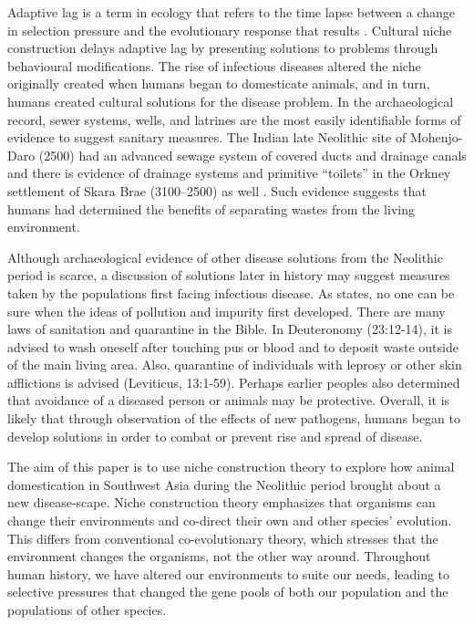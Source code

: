 Adaptive lag is a term in ecology that refers to the time lapse between a change in selection pressure and the evolutionary response that results \parencite[98]{Laland_2006}. 
Cultural niche construction delays adaptive lag by presenting solutions to problems through behavioural modifications. 
The rise of infectious diseases altered the niche originally created when humans began to domesticate animals, and in turn, humans created cultural solutions for the disease problem. 
In the archaeological record, sewer systems, wells, and latrines are the most easily identifiable forms of evidence to suggest sanitary measures.
The Indian late Neolithic site of Mohenjo-Daro (2500\BC) had an advanced sewage system of covered ducts and drainage canals \parencite[121]{Mughal_2011} 
and there is evidence of drainage systems and primitive “toilets” 
in the Orkney settlement of Skara Brae (3100--2500\BC) as well \parencite{Gordon-Childe_1983}. 
Such evidence suggests that humans had determined the benefits of separating wastes from the living environment.

Although archaeological evidence of other disease solutions from the Neolithic period is scarce, 
a discussion of solutions later in history may suggest measures taken by the populations 
first facing infectious disease. As \textcite[3]{Douglas_1966} states, 
no one can be sure when the ideas of pollution and impurity first developed. 
There are many laws of sanitation and quarantine in the Bible. In Deuteronomy (23:12-14), 
it is advised to wash oneself after touching pus or blood and to deposit waste outside of the main living area.
Also, quarantine of individuals with leprosy or other skin afflictions is advised (Leviticus, 13:1-59).
Perhaps earlier peoples also determined that avoidance of a diseased person or animals may be protective. Overall, it is likely that through observation of the effects of new pathogens, humans began to develop solutions in order to combat or prevent rise and spread of disease.

The aim of this paper is to use niche construction theory to explore how animal domestication in Southwest Asia during the Neolithic period brought about a new disease-scape. Niche construction theory emphasizes that organisms can change their environments and co-direct their own and other species’ evolution. This differs from conventional co-evolutionary theory, which stresses that the environment changes the organisms, not the other way around. Throughout human history, we have altered our environments to suite our needs, leading to selective pressures that changed the gene pools of both our population and the populations of other species.

